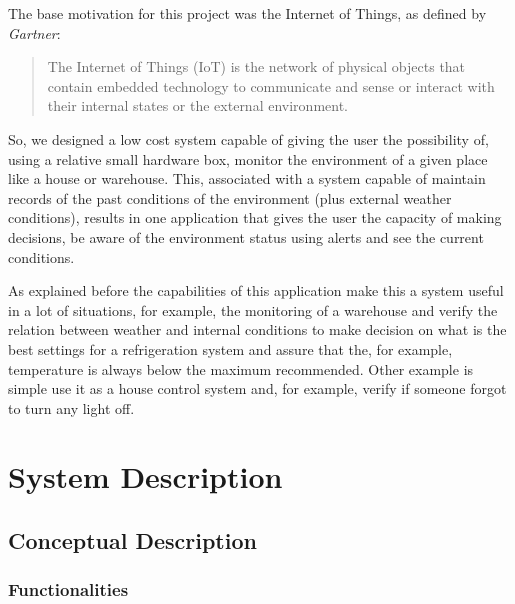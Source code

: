 \documentclass[12pt]{report}
\begin{document}
The base motivation for this project was the Internet of Things, as defined by \textit{Gartner}:

\blockquote{The Internet of Things (IoT) is the network of physical objects that contain embedded technology to communicate and sense or interact with their internal states or the external environment.}

So, we designed a low cost system capable of giving the user the possibility of, using a relative small hardware box, monitor the environment of a given place like a house or warehouse. This, associated with a system capable of maintain records of the past conditions of the environment (plus external weather conditions), results in one application that gives the user the capacity of making decisions, be aware of the environment status using alerts and see the current conditions.

As explained before the capabilities of this application make this a system useful in a lot of situations, for example, the monitoring of a warehouse and verify the relation between weather and internal conditions to make decision on what is the best settings for a refrigeration system and assure that the, for example, temperature is always below the maximum recommended. Other example is simple use it as a house control system and, for example, verify if someone forgot to turn any light off.

\newpage
\chapter{System Description}
\section{Conceptual Description}
\subsection{Functionalities}
\end{document}
